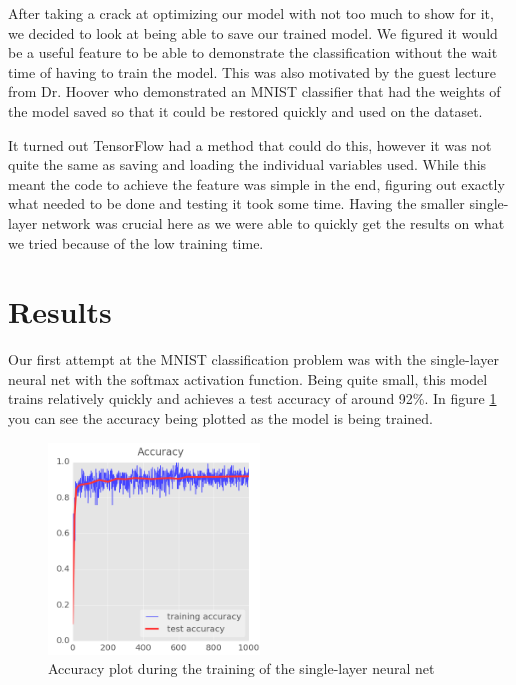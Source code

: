 \documentclass{article}
\begin{document}
After taking a crack at optimizing our model with not too much to show for it, we decided to look at being able to save our trained model. We figured it would be a useful feature to be able to demonstrate the classification without the wait time of having to train the model. This was also motivated by the guest lecture from Dr. Hoover who demonstrated an MNIST classifier that had the weights of the model saved so that it could be restored quickly and used on the dataset.

It turned out TensorFlow had a method that could do this, however it was not quite the same as saving and loading the individual variables used. While this meant the code to achieve the feature was simple in the end, figuring out exactly what needed to be done and testing it took some time. Having the smaller single-layer network was crucial here as we were able to quickly get the results on what we tried because of the low training time.


\section{Results}

Our first attempt at the MNIST classification problem was with the single-layer neural net with the softmax activation function. Being quite small, this model trains relatively quickly and achieves a test accuracy of around 92\%. In figure \ref{fig:mnist-single} you can see the accuracy being plotted as the model is being trained.

\begin{figure}[h]
	\centering
	\includegraphics[width=0.5\textwidth]{mnist-single.png}
    \caption{Accuracy plot during the training of the single-layer neural net}
    \label{fig:mnist-single}
\end{figure}
\end{document}
